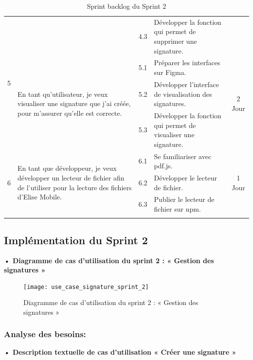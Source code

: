 \begin{adjustwidth}{-1cm}{}
\begin{longtable}{|c|p{6cm}|c|p{6cm}|c|}
      \cline{3-4}
      & & 4.3 & Développer la fonction qui permet de supprimer une signature. & \\
      \cline{1-5}
      \multirow{2}{*}{5} & \multirow{3}{6cm}{En tant qu'utilisateur, je veux visualiser une signature que j'ai créée, pour m'assurer qu'elle est correcte.} & 5.1 & Préparer les interfaces sur Figma. & \multirow{3}{*}{2 Jour} \\
      \cline{3-4}
      & & 5.2 & Développer l'interface de visualisation des signatures. & \\
      \cline{3-4}
      & & 5.3 & Développer la fonction qui permet de visualiser une signature. & \\
      \cline{1-5}
      \multirow{3}{*}{6} & \multirow{3}{6cm}{En tant que développeur, je veux développer un lecteur de fichier afin de l'utiliser pour la lecture des fichiers d'Elise Mobile.} & 6.1 & Se familiariser avec pdf.js. & \multirow{3}{*}{1 Jour} \\
      \cline{3-4}
      & & 6.2 & Développer le lecteur de fichier. & \\
      \cline{3-4}
      & & 6.3 & Publier le lecteur de fichier sur npm. & \\
  \hline
  \caption{Sprint backlog du Sprint 2}
  \label{tab:sprint-backlog-2}
\end{longtable}
\end{adjustwidth}

\subsection{Implémentation du Sprint 2}
\textbf{•	Diagramme de cas d'utilisation du sprint 2 : « Gestion des signatures »}

\begin{figure}[H]
  \centering
  \texttt{[image: use\_case\_signature\_sprint\_2]}
  \caption{Diagramme de cas d'utilisation du sprint 2 : « Gestion des signatures »}
  \label{fig:UseCaseDiagram}
\end{figure}

\subsubsection{Analyse des besoins:}
\textbf{•	Description textuelle de cas d'utilisation « Créer une signature »}


